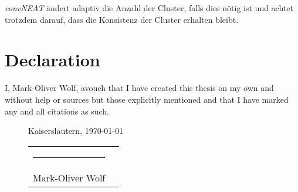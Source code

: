 \documentclass[]{scrartcl}
\begin{document}
				\textit{convNEAT} ändert adaptiv die Anzahl der Cluster, falls dies nötig ist und achtet trotzdem darauf, dass die Konsistenz der Cluster erhalten bleibt.




			



	
	

\clearpage

\printbibliography[heading=bibintoc, title={References}]

\clearpage

\section*{Declaration}
	\vspace{2cm}
	
	\large
	I, Mark-Oliver Wolf, avouch that I have created this thesis on my own and without help or sources but those explicitly mentioned and that I have marked any and all citations as such.
	
	\vspace{3cm}
	\begin{figure}[b]
		Kaiserslautern, \today
		
		\vspace{2em}
		\begin{tabularx}{\linewidth}{@{}XX@{}}
			\hrule&\\
			Mark-Oliver Wolf & \\
		\end{tabularx}
	\end{figure}
\end{document}
